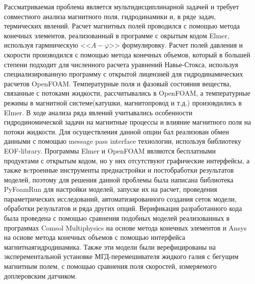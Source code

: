 {\methods} Рассматриваемая проблема является мультидисциплинарной задачей и требует совместного анализа магнитного поля, гидродинамики и, в ряде задач, термических явлений. Расчет магнитных полей  проводился с помощью метода конечных элементов, реализованный в  программе с окрытым кодом Elmer, используя гармническую <<$A-\varphi$>> формулировку. Расчет полей давления и скорости производился с  помощью метода конечных объемов, который в большей степени подходит для численного расчета уравнений Навье-Стокса, используя специализированную программу с открытой лицензией для гидродинамических расчетов OpenFOAM. Температурные поля и фазовый состояния вещества, связанные с потоками жидкости, рассчитывались в OpenFOAM, а температурные режимы в магнитной системе(катушки, магнитопровод и т.д.) произовдились в Elmer. В ходе анализа ряда явлений учитывались особенности гидродиномической задачи на магнитные процессы и влияние магнитного поля на потоки жидкости. Для осуществления данной опции бал реализован обмен данными с помощью message pass interface технологии, используя библиотеку EOF-library. Программы Elmer и OpenFOAM являются бесплатными продуктами с открытым кодом, но у них отсутствуют графические интерфейсы, а также вcтроенные инструменты преднастройки и постобработки результатов моделей, поэтому для решения данной проблемы была написана библиотека PyFoamRun для настройки моделей, запуске их на расчет, проведения параметрических исследований, автоматизированного создания сеток модели, обработки результатов и ряда других опций. Верификация разработанного кода была проведена с помощью сравнения подобных моделей реализованных в программах Comsol Multiphysics на основе метода конечных элементов и Ansys на основе метода конечных объемов с помощью интерфейса магнитнаягидродинамика. Также эти модели были верефицированы на эксперементальной установке МГД-перемешивателя жидкого галия с бегущим магнитным полем, с помощью сравнения поля скоростей, измеряемого доплеровским датчиком. 


